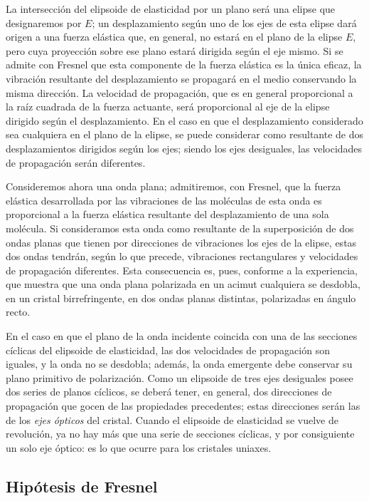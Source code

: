 La intersección del elipsoide de elasticidad por un plano será una elipse
que designaremos por $E$; un desplazamiento según uno de los ejes de esta
elipse dará origen a una fuerza elástica que, en general, no estará en el
plano de la elipse $E$, pero cuya proyección sobre ese plano estará
dirigida según el eje mismo. Si se admite con Fresnel que esta componente
de la fuerza elástica es la única eficaz, la vibración resultante del
desplazamiento se propagará en el medio conservando la misma dirección. La
velocidad de propagación, que es en general proporcional a la raíz
cuadrada de la fuerza actuante, será proporcional al eje de la elipse
dirigido según el desplazamiento. En el caso en que el desplazamiento
considerado sea cualquiera en el plano de la elipse, se puede considerar
como resultante de dos desplazamientos dirigidos según los ejes; siendo
los ejes desiguales, las velocidades de propagación serán diferentes.

Consideremos ahora una onda plana; admitiremos, con Fresnel, que la fuerza
elástica desarrollada por las vibraciones de las moléculas de esta onda es
proporcional a la fuerza elástica resultante del desplazamiento de una
sola molécula. Si consideramos esta onda como resultante de la
superposición de dos ondas planas que tienen por direcciones de
vibraciones los ejes de la elipse, estas dos ondas tendrán, según lo que
precede, vibraciones rectangulares y velocidades de propagación
diferentes. Esta consecuencia es, pues, conforme a la experiencia, que
muestra que una onda plana polarizada en un acimut cualquiera se desdobla,
en un cristal birrefringente, en dos ondas planas distintas, polarizadas
en ángulo recto.

En el caso en que el plano de la onda incidente coincida con una de las
secciones cíclicas del elipsoide de elasticidad, las dos velocidades de
propagación son iguales, y la onda no se desdobla; además, la onda
emergente debe conservar su plano primitivo de polarización. Como un
elipsoide de tres ejes desiguales posee dos series de planos cíclicos, se
deberá tener, en general, dos direcciones de propagación que gocen de las
propiedades precedentes; estas direcciones serán las de los \emph{ejes
ópticos} del cristal. Cuando el elipsoide de elasticidad se vuelve de
revolución, ya no hay más que una serie de secciones cíclicas, y por
consiguiente un solo eje óptico: es lo que ocurre para los cristales
uniaxes.

\subsection{Hipótesis de Fresnel}

